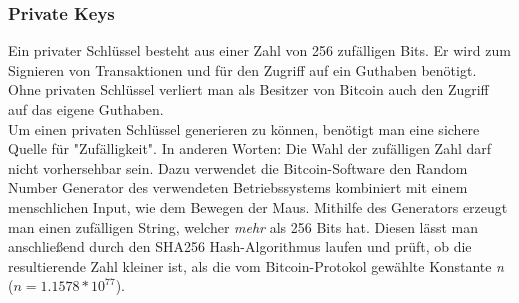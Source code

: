 \subsubsection{Private Keys}
Ein privater Schlüssel besteht aus einer Zahl von 256 zufälligen Bits. Er wird zum Signieren von Transaktionen und für den Zugriff auf ein Guthaben benötigt. Ohne privaten Schlüssel verliert man als Besitzer von Bitcoin auch den Zugriff auf das eigene Guthaben.\\
Um einen privaten Schlüssel generieren zu können, benötigt man eine sichere Quelle für "Zufälligkeit". In anderen Worten: Die Wahl der zufälligen Zahl darf nicht vorhersehbar sein. Dazu verwendet die Bitcoin-Software den Random Number Generator des verwendeten Betriebssystems kombiniert mit einem menschlichen Input, wie dem Bewegen der Maus. Mithilfe des Generators erzeugt man einen zufälligen String, welcher \emph{mehr} als 256 Bits hat. Diesen lässt man anschließend durch den SHA256 Hash-Algorithmus laufen und prüft, ob die resultierende Zahl kleiner ist, als die vom Bitcoin-Protokol gewählte Konstante \emph{n} ($n = 1.1578 * 10^{77}$).

